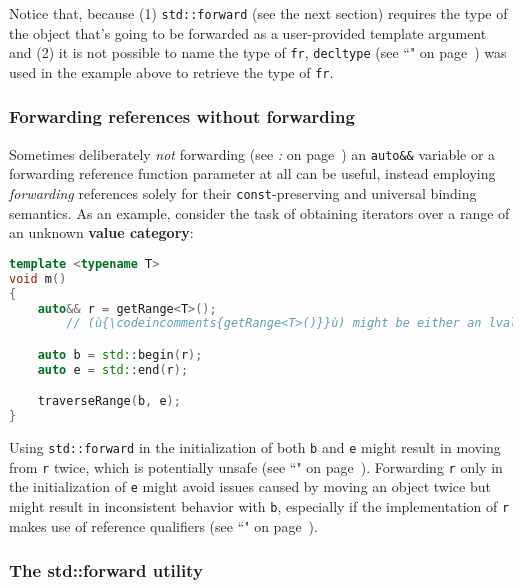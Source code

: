 \noindent Notice that, because (1) \texttt{std::forward} (see the next section) requires the
type of the object that's going to be forwarded as a user-provided
template argument and (2) it is not possible to name the type of
\texttt{fr}, \texttt{decltype} (see ``" on page~\pageref{decltype}) was used in the example above
to retrieve the type of \texttt{fr}.

\subsubsection[Forwarding references without forwarding]{Forwarding references without forwarding}\label{forwarding-references-without-forwarding}

Sometimes deliberately \emph{not} forwarding (see \textit{: } on page~\pageref{the-std::forward-utility}) an \texttt{auto\&\&} variable or
a forwarding reference function parameter at all can be useful, instead employing
\emph{forwarding} references solely for their \texttt{const}-preserving
and universal binding semantics. As an example, consider the task of
obtaining iterators over a range of an unknown \textbf{value category}:

\begin{lstlisting}[language=C++]
template <typename T>
void m()
{
    auto&& r = getRange<T>();
        // (ù{\codeincomments{getRange<T>()}}ù) might be either an lvalue or rvalue depending on (ù{\codeincomments{T}}ù).

    auto b = std::begin(r);
    auto e = std::end(r);

    traverseRange(b, e);
}
\end{lstlisting}

\noindent Using \texttt{std::forward} in the initialization of both \texttt{b} and
\texttt{e} might result in moving from \texttt{r} twice, which is
potentially unsafe (see ``" on page~\pageref{Rvalue-References}). Forwarding
\texttt{r} only in the initialization of \texttt{e} might avoid issues
caused by moving an object twice but might result in inconsistent
behavior with \texttt{b}, especially if the implementation of \texttt{r}
makes use of reference qualifiers (see ``" on page~\pageref{refqualifiers}).

\subsubsection[The {\tt std::forward} utility]{The {\SubsubsecCode std::forward} utility}\label{the-std::forward-utility}

